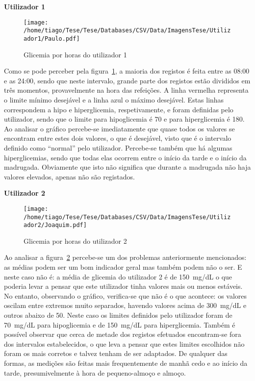 \textbf{Utilizador 1}

\begin{figure}[H]
\centering
\texttt{[image: /home/tiago/Tese/Tese/Databases/CSV/Data/ImagensTese/Utilizador1/Paulo.pdf]}
\caption{Glicemia por horas do utilizador 1}
\label{fig:uti1}
\end{figure}
Como se pode perceber pela figura~\ref{fig:uti1}, a maioria dos registos é feita entre as 08:00 e as 24:00, sendo que neste intervalo, grande parte dos registos estão divididos em três momentos, provavelmente na hora das refeições. A linha vermelha representa o limite mínimo desejável e a linha azul o máximo desejável. Estas linhas correspondem a hipo e hiperglicemia, respetivamente, e foram definidas pelo utilizador, sendo que o limite para hipoglicemia é 70 e para hiperglicemia é 180. Ao analisar o gráfico percebe-se imediatamente que quase todos os valores se encontram entre estes dois valores, o que é desejável, visto que é o intervalo definido como ``normal'' pelo utilizador. Percebe-se também que há algumas hiperglicemias, sendo que todas elas ocorrem entre o início da tarde e o início da madrugada. Obviamente que isto não significa que durante a madrugada não haja valores elevados, apenas não são registados. 


\textbf{Utilizador 2}

\begin{figure}[H]
\centering
\texttt{[image: /home/tiago/Tese/Tese/Databases/CSV/Data/ImagensTese/Utilizador2/Joaquim.pdf]}
\caption{Glicemia por horas do utilizador 2}
\label{fig:uti2}
\end{figure}
Ao analisar a figura~\ref{fig:uti2} percebe-se um dos problemas anteriormente mencionados: as médias podem ser um bom indicador geral mas também podem não o ser. E neste caso não é: a média de glicemia do utilizador 2 é de 150~mg/dL o que poderia levar a pensar que este utilizador tinha valores mais ou menos estáveis. No entanto, observando o gráfico, verifica-se que não é o que acontece: os valores oscilam entre extremos muito separados, havendo valores acima de 300~mg/dL e outros abaixo de 50. Neste caso os limites definidos pelo utilizador foram de 70~mg/dL para hipoglicemia e de 150~mg/dL para hiperglicemia. Também é possível observar que cerca de metade dos registos efetuados encontram-se fora dos intervalos estabelecidos, o que leva a pensar que estes limites escolhidos não foram os mais corretos e talvez tenham de ser adaptados. De qualquer das formas, as medições são feitas mais frequentemente de manhã cedo e ao início da tarde, presumivelmente à hora de pequeno-almoço e almoço. 


